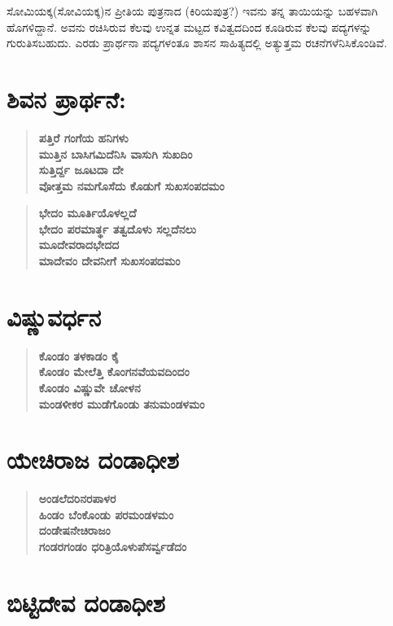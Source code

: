 ಸೋಮಿಯಕ್ಕ(ಸೋವಿಯಕ್ಕ)ನ ಪ್ರೀತಿಯ ಪುತ್ರನಾದ (ಕಿರಿಯಪುತ್ರ?) ಇವನು ತನ್ನ ತಾಯಿಯನ್ನು ಬಹಳವಾಗಿ ಹೊಗಳಿದ್ದಾನೆ. ಅವನು ರಚಿಸಿರುವ ಕೆಲವು ಉನ್ನತ ಮಟ್ಟದ ಕವಿತ್ವದದಿಂದ ಕೂಡಿರುವ ಕೆಲವು ಪದ್ಯಗಳನ್ನು ಗುರುತಿಸಬಹುದು. ಎರಡು ಪ್ರಾರ್ಥನಾ ಪದ್ಯಗಳಂತೂ ಶಾಸನ ಸಾಹಿತ್ಯದಲ್ಲಿ ಅತ್ಯುತ್ತಮ ರಚನೆಗಳೆನಿಸಿಕೊಂಡಿವೆ.


\section{ಶಿವನ ಪ್ರಾರ್ಥನೆ:}

\begin{verse}
\textbf{ಪತ್ತಿರೆ ಗಂಗೆಯ ಹನಿಗಳು} \\\textbf{ಮುತ್ತಿನ ಬಾಸಿಗಮಿದೆನಿಸಿ ವಾಸುಗಿ ಸುಖದಿಂ} \\\textbf{ಸುತ್ತಿರ್ದ್ದ ಜೂಟದಾ ದೇ} \\\textbf{ವೋತ್ತಮ ನಮಗೊಸೆದು ಕೊಡುಗೆ ಸುಖಸಂಪದಮಂ}
\end{verse}

\begin{verse}
\textbf{ಭೇದಂ ಮೂರ್ತಿಯೊಳಲ್ಲದೆ} \\\textbf{ಭೇದಂ ಪರಮಾರ್ತ್ಥ ತತ್ವದೊಳು ಸಲ್ಲದೆನಲು} \\\textbf{ಮೂದೇವರಾದಭೇದದ} \\\textbf{ಮಾದೇವಂ ದೇವನೀಗೆ ಸುಖಸಂಪದಮಂ}
\end{verse}


\section{ವಿಷ್ಣುವರ್ಧನ}

\begin{verse}
\textbf{ಕೊಂಡಂ ತಳಕಾಡಂ ಕೈ} \\\textbf{ಕೊಂಡಂ ಮೇಲೆತ್ತಿ ಕೊಂಗನವೆಯವದಿಂದಂ} \\\textbf{ಕೊಂಡಂ ವಿಷ್ಣುವೇ ಚೋಳನ} \\\textbf{ಮಂಡಳೀಕರ ಮುಡೆಗೊಂಡು ತನುಮಂಡಳಮಂ}
\end{verse}


\section{ಯೇಚಿರಾಜ ದಂಡಾಧೀಶ}

\begin{verse}
\textbf{ಅಂಡಲೆದರಿನರಪಾಳರ} \\\textbf{ಹಿಂಡಂ ಬೆಂಕೊಂಡು ಪರಮಂಡಳಮಂ} \\\textbf{ದಂಡೇಷನೇಚಿರಾಜಂ} \\\textbf{ಗಂಡರಗಂಡಂ ಧರಿತ್ರಿಯೊಳುಪೆಸರ್ವ್ವಡೆದಂ}
\end{verse}


\section{ಬಿಟ್ಟಿದೇವ ದಂಡಾಧೀಶ}

